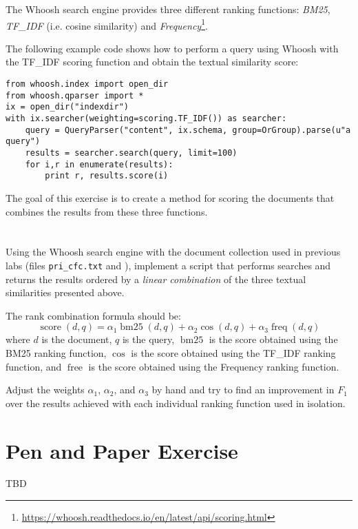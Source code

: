 \documentclass[12pt]{article}
\begin{document}

The Whoosh search engine provides three different ranking functions: \emph{BM25}, \emph{TF\_IDF} (i.e. cosine similarity) and \emph{Frequency}\footnote{\url{https://whoosh.readthedocs.io/en/latest/api/scoring.html}}. 

The following example code shows how to perform a query using Whoosh with the
TF\_IDF scoring function and obtain the textual similarity score:
\begin{verbatim}
from whoosh.index import open_dir
from whoosh.qparser import *
ix = open_dir("indexdir")
with ix.searcher(weighting=scoring.TF_IDF()) as searcher:
    query = QueryParser("content", ix.schema, group=OrGroup).parse(u"a query")
    results = searcher.search(query, limit=100)
    for i,r in enumerate(results):
        print r, results.score(i)
\end{verbatim}

The goal of this exercise is to create a method for scoring the documents that combines the results from these three functions.

\section{}

Using the Whoosh search engine with the document collection used in previous labs (files \texttt{pri\_cfc.txt} and \texttt{}), implement a script that performs
searches and returns the results ordered by a \emph{linear combination} of the three textual similarities presented above.

The rank combination formula should be:
\begin{displaymath}
    \operatorname{score}(d,q) = \alpha_1\operatorname{bm25}(d,q) + \alpha_2\operatorname{cos}(d,q) + \alpha_3\operatorname{freq}(d,q)
\end{displaymath}
where $d$ is the document, $q$ is the query, $\operatorname{bm25}$ is the score obtained using the BM25 ranking function, $\operatorname{cos}$ is the score obtained using the TF\_IDF ranking function, and $\operatorname{free}$ is the score obtained using the Frequency ranking function.

Adjust the weights $\alpha_1$, $\alpha_2$, and $\alpha_3$ by hand and try to find an improvement in $F_1$ over the results achieved with each individual ranking
function used in isolation.

\section{}


\section{Pen and Paper Exercise}

TBD
\end{document}
